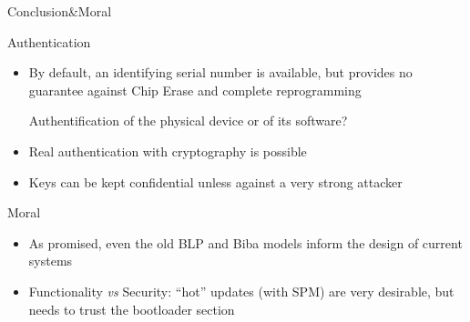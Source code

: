 \begin{reveals}
\begin{frame}[c]{Conclusion\&Moral}
  \vfill

  \begin{block}{Authentication}
    \begin{itemize}
    \item By default, an identifying serial number is available, but
      provides no guarantee against Chip Erase and complete
      reprogramming
      \begin{center}
        \color{red}Authentification of the physical device or of its software?
      \end{center}
    \item  Real authentication with cryptography is possible
    \item Keys can be kept confidential unless against a very strong
      attacker
    \end{itemize}
  \end{block}

  \vfill

  \begin{block}{Moral}
    \begin{itemize}
    \item As promised, even the old BLP and Biba models inform the
      design of current systems
    \item Functionality \textit{vs} Security: ``hot'' updates (with
      SPM) are very desirable, but needs to trust the bootloader section
    \end{itemize}
  \end{block}

\end{frame}


\end{reveals}

